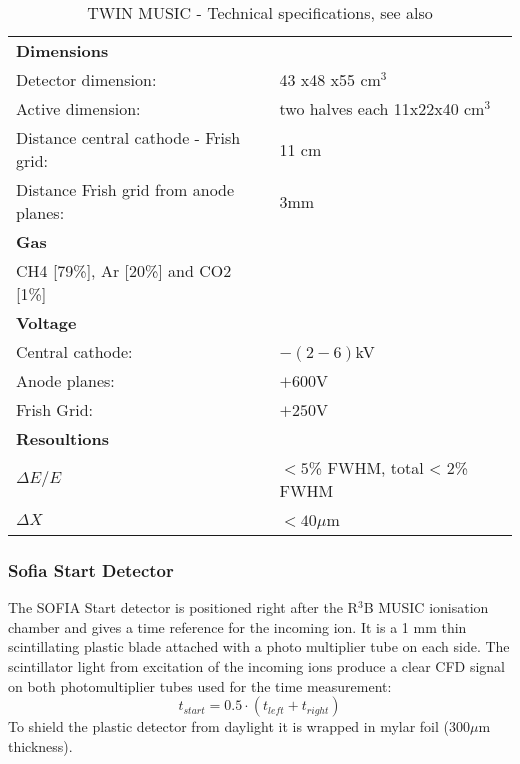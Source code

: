 \newline
\begin{table}[h!]
    \centering
    \begin{tabular}{ll}
        \hline
        \textbf{Dimensions} & \\ 
	Detector dimension: & 43 x48 x55 cm$^3$ \\ 
	Active dimension: & two halves each  11x22x40 cm$^3$\\
	Distance central cathode - Frish grid: & 11 cm\\
	Distance Frish grid from anode planes: & 3mm\\ %
	\textbf{Gas} &\\
	CH4 [79\%], Ar [20\%] and CO2 [1\%] \\
	\textbf{Voltage} & \\
	Central cathode: &  $-(2-6)$kV \\
	Anode planes: & $+600$V \\
	Frish Grid: & $+250$V\\
	\textbf{Resoultions} & \\
	$\Delta E / E$ & $< 5$\% FWHM, total < 2\% FWHM \\
	$\Delta X$ & $< 40 \mu$m\\
	\hline
    \end{tabular}
    \caption{TWIN MUSIC - Technical specifications, see also \cite{martin2021fission}}
	\label{table:twin_tecs}
\end{table}
\newline
    

\subsubsection{Sofia Start Detector}
The SOFIA Start detector is positioned right after the R$^3$B MUSIC ionisation chamber and gives a time reference for the incoming ion. It is a 1 mm thin scintillating plastic blade attached with a photo multiplier tube on each side. The scintillator light from excitation of the incoming ions produce a clear CFD signal on both photomultiplier tubes used for the time measurement: \[t_{start} = 0.5 \cdot (t_{left}+t_{right}) \]\newline
To shield the plastic detector from daylight it is wrapped in mylar foil (300$\mu$m thickness).
